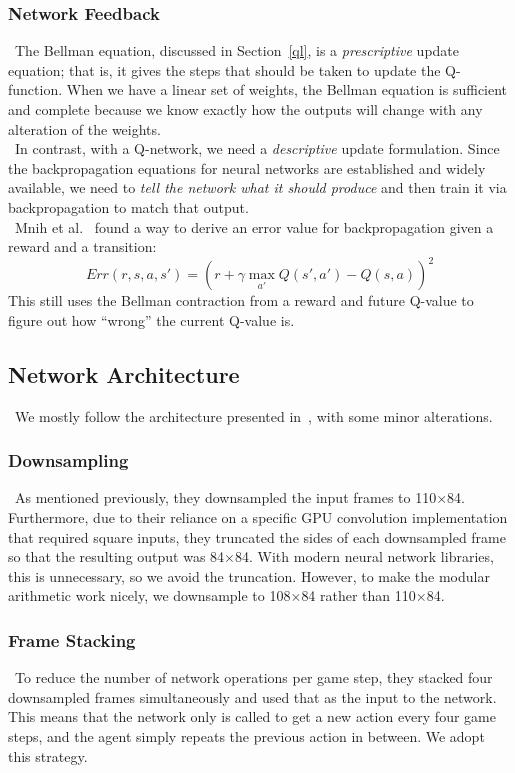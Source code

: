 \documentclass[conference]{IEEEtran}
\begin{document}
\subsubsection{Network Feedback}
\noindent\ The Bellman equation, discussed in Section~\ref{ql}, is a
\emph{prescriptive} update equation; that is, it gives the steps that should be
taken to update the Q-function. When we have a linear set of weights, the
Bellman equation is sufficient and complete because we know exactly how the
outputs will change with any alteration of the weights.\\
\indent\ In contrast, with a Q-network, we need a \emph{descriptive} update
formulation.  Since the backpropagation equations for neural networks are
established and widely available, we need to \emph{tell the network what it
should produce} and then train it via backpropagation to match that output.\\
\indent\ Mnih et al.~\cite{mnih2013playing} found a way to derive an error
value for backpropagation given a reward and a transition:
\begin{equation}
    Err(r, s, a, s')={\left(r+\gamma\max_{a'}Q(s',a')-Q(s,a)\right)}^{2}
\end{equation}
This still uses the Bellman contraction from a reward and future Q-value to
figure out how ``wrong'' the current Q-value is.

\subsection{Network Architecture}
\noindent\ We mostly follow the architecture presented
in~\cite{mnih2013playing}, with some minor alterations.

\subsubsection{Downsampling}
\noindent\ As mentioned previously, they downsampled the input frames to
110$\times$84. Furthermore, due to their reliance on a specific GPU convolution
implementation that required square inputs, they truncated the sides of each
downsampled frame so that the resulting output was 84$\times$84. With modern
neural network libraries, this is unnecessary, so we avoid the truncation.
However, to make the modular arithmetic work nicely, we downsample to
108$\times$84 rather than 110$\times$84.

\subsubsection{Frame Stacking}
\noindent\ To reduce the number of network operations per game step, they
stacked four downsampled frames simultaneously and used that as the input to
the network. This means that the network only is called to get a new action
every four game steps, and the agent simply repeats the previous action in
between. We adopt this strategy.
\end{document}
